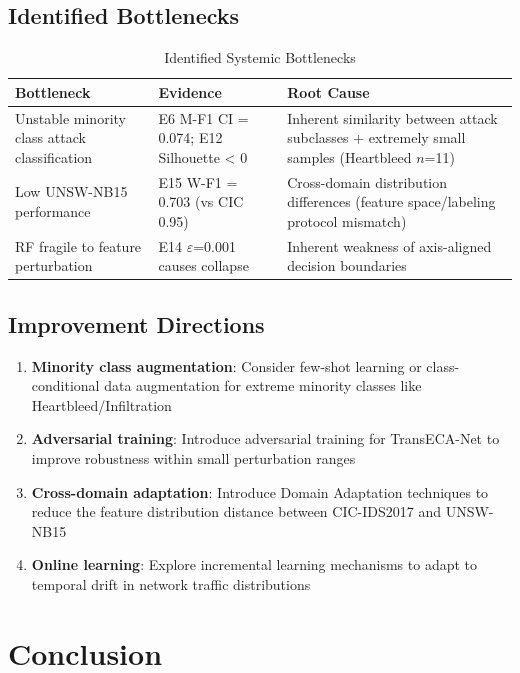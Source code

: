 \documentclass[sigconf]{acmart}
\begin{document}
\subsection{Identified Bottlenecks}

\begin{table}[H]
\caption{Identified Systemic Bottlenecks}
\label{tab:bottlenecks}
\begin{tabular}{lll}
\toprule
\textbf{Bottleneck} & \textbf{Evidence} & \textbf{Root Cause} \\
\midrule
Unstable minority class attack classification & E6 M-F1 CI = 0.074; E12 Silhouette < 0 & Inherent similarity between attack subclasses + extremely small samples (Heartbleed $n$=11) \\
Low UNSW-NB15 performance & E15 W-F1 = 0.703 (vs CIC 0.95) & Cross-domain distribution differences (feature space/labeling protocol mismatch) \\
RF fragile to feature perturbation & E14 $\varepsilon$=0.001 causes collapse & Inherent weakness of axis-aligned decision boundaries \\
\bottomrule
\end{tabular}
\end{table}

\subsection{Improvement Directions}

\begin{enumerate}
\item \textbf{Minority class augmentation}: Consider few-shot learning or class-conditional data augmentation for extreme minority classes like Heartbleed/Infiltration
\item \textbf{Adversarial training}: Introduce adversarial training for TransECA-Net to improve robustness within small perturbation ranges
\item \textbf{Cross-domain adaptation}: Introduce Domain Adaptation techniques to reduce the feature distribution distance between CIC-IDS2017 and UNSW-NB15
\item \textbf{Online learning}: Explore incremental learning mechanisms to adapt to temporal drift in network traffic distributions
\end{enumerate}

\section{Conclusion}
\end{document}
